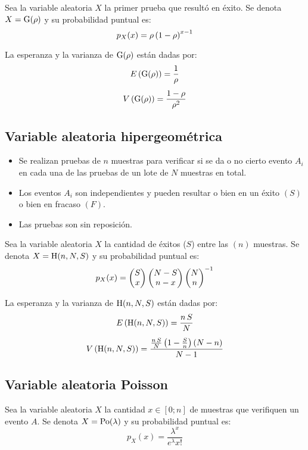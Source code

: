 \documentclass[a5paper,12pt,twoside]{book}
\begin{document}
Sea la variable aleatoria $X$ la primer prueba que resultó en éxito.
Se denota $X=\operatorname{G}(\rho)$ y su probabilidad puntual es:
\begin{equation*}
    p_X(x) = \rho \left(1-\rho\right)^{x-1}
\end{equation*}

La esperanza y la varianza de $\operatorname{G}(\rho)$ están dadas por:
\begin{gather*}
    E \left(\operatorname{G}(\rho)\right) = \frac{1}{\rho}
    \\[1ex]
    V \left(\operatorname{G}(\rho)\right) = \frac{1-\rho}{\rho^2}
\end{gather*}


\subsection{Variable aleatoria hipergeométrica}

\begin{itemize}
\item Se realizan pruebas de $n$ muestras para verificar si se da o no cierto evento $A_i$ en cada una de las pruebas de un lote de $N$ muestras en total.

\item Los eventos $A_i$ son independientes y pueden resultar o bien en un éxito $(S)$ o bien en fracaso $(F)$.

\item Las pruebas son sin reposición.
\end{itemize}

Sea la variable aleatoria $X$ la cantidad de éxitos ($S$) entre las $(n)$ muestras.
Se denota $X=\operatorname{H}(n,N,S)$ y su probabilidad puntual es:
\begin{equation*}
    p_X(x) = \begin{pmatrix} {S}\\{x} \end{pmatrix} \begin{pmatrix} {N-S}\\{n-x} \end{pmatrix} \begin{pmatrix} {N}\\{n} \end{pmatrix}^{-1}
\end{equation*}

La esperanza y la varianza de $\operatorname{H}(n,N,S)$ están dadas por:
\begin{gather*}
    E \left(\operatorname{H}(n,N,S)\right) = \frac{n \, S}{N}
    \\[1ex]
    V \left(\operatorname{H}(n,N,S)\right) = \frac{\frac{n \, S}{N} \left(1- \frac{S}{n}\right) (N-n)}{N-1}
\end{gather*}


\subsection{Variable aleatoria Poisson}

Sea la variable aleatoria $X$ la cantidad $x \in [0;n]$ de muestras que verifiquen un evento $A$.
Se denota $X=\operatorname{Po}(\lambda)$ y su probabilidad puntual es:
\begin{equation*}
    p_X(x) = \frac{\lambda^x}{e^\lambda x!}
\end{equation*}
\end{document}
